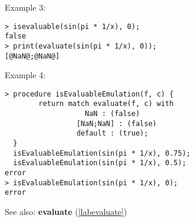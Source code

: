 \noindent Example 3: 
\begin{center}\begin{minipage}{15cm}\begin{Verbatim}[frame=single]
> isevaluable(sin(pi * 1/x), 0);
false
> print(evaluate(sin(pi * 1/x), 0));
[@NaN@;@NaN@]
\end{Verbatim}
\end{minipage}\end{center}
\noindent Example 4: 
\begin{center}\begin{minipage}{15cm}\begin{Verbatim}[frame=single]
> procedure isEvaluableEmulation(f, c) {
        return match evaluate(f, c) with 
                   NaN : (false)
                 [NaN;NaN] : (false)
                 default : (true);
  }
  isEvaluableEmulation(sin(pi * 1/x), 0.75);
  isEvaluableEmulation(sin(pi * 1/x), 0.5);
error
> isEvaluableEmulation(sin(pi * 1/x), 0);
error
\end{Verbatim}
\end{minipage}\end{center}
See also: \textbf{evaluate} (\ref{labevaluate})
